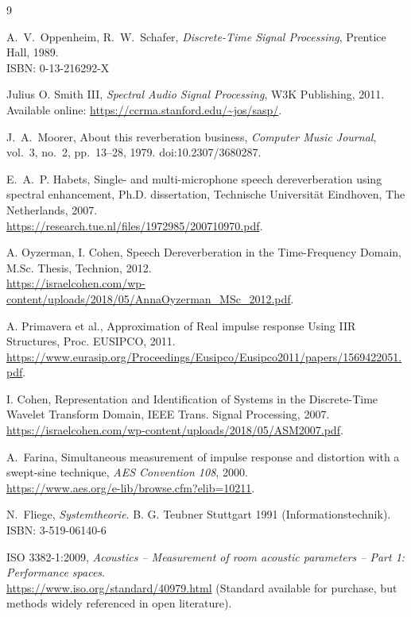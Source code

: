 \documentclass{article}
\begin{document}
\begin{thebibliography}{9}
 
A.~V.~Oppenheim, R.~W.~Schafer, \emph{Discrete-Time Signal Processing}, Prentice Hall, 1989.\\
ISBN: 0-13-216292-X

Julius O. Smith III, \emph{Spectral Audio Signal Processing}, W3K Publishing, 2011.\\
Available online: \url{https://ccrma.stanford.edu/~jos/sasp/}.

J.~A.~Moorer, About this reverberation business, \emph{Computer Music Journal}, vol.~3, no.~2, pp.~13--28, 1979. doi:10.2307/3680287.

E.~A.~P. Habets, Single- and multi-microphone speech dereverberation using spectral enhancement, Ph.D. dissertation, Technische Universität Eindhoven, The Netherlands, 2007. \\
\url{https://research.tue.nl/files/1972985/200710970.pdf}.

A. Oyzerman, I. Cohen, Speech Dereverberation in the Time-Frequency Domain, M.Sc. Thesis, Technion, 2012. \\
\url{https://israelcohen.com/wp-content/uploads/2018/05/AnnaOyzerman_MSc_2012.pdf}.

A. Primavera et al., Approximation of Real impulse response Using IIR Structures, Proc. EUSIPCO, 2011. \\
\url{https://www.eurasip.org/Proceedings/Eusipco/Eusipco2011/papers/1569422051.pdf}.

I. Cohen, Representation and Identification of Systems in the Discrete-Time Wavelet Transform Domain, IEEE Trans. Signal Processing, 2007. \\
\url{https://israelcohen.com/wp-content/uploads/2018/05/ASM2007.pdf}.

A.~Farina, Simultaneous measurement of impulse response and distortion with a swept-sine technique, \emph{AES Convention 108}, 2000.\\
\url{https://www.aes.org/e-lib/browse.cfm?elib=10211}.

N.~Fliege, \emph{Systemtheorie}. B. G. Teubner Stuttgart 1991 (Informationstechnik).  \\ 
ISBN: 3-519-06140-6

ISO 3382-1:2009, \emph{Acoustics -- Measurement of room acoustic parameters -- Part 1: Performance spaces}. \\
\url{https://www.iso.org/standard/40979.html} (Standard available for purchase, but methods widely referenced in open literature).


\end{thebibliography}
\end{document}
